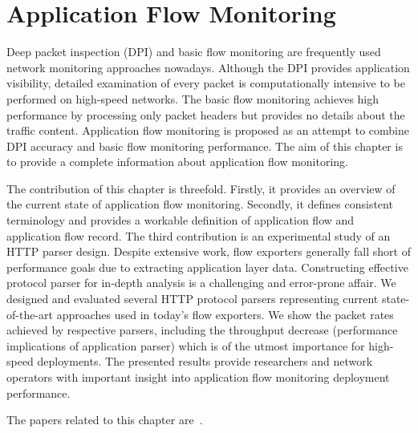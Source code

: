 \chapter{Application Flow Monitoring}

\begin{chapintro}

Deep packet inspection (DPI) and basic flow monitoring are frequently used network monitoring approaches nowadays. Although the DPI provides application visibility, detailed examination of every packet is computationally intensive to be performed on high-speed networks. The basic flow monitoring achieves high performance by processing only packet headers but provides no details about the traffic content. Application flow monitoring is proposed as an attempt to combine DPI accuracy and basic flow monitoring performance. The aim of this chapter is to provide a complete information about application flow monitoring. 

The contribution of this chapter is threefold. Firstly, it provides an overview of the current state of application flow monitoring. Secondly, it defines consistent terminology and provides a workable definition of application flow and application flow record. The third contribution is an experimental study of an HTTP parser design. Despite extensive work, flow exporters generally fall short of performance goals due to extracting application layer data. Constructing effective protocol parser for in-depth analysis is a challenging and error-prone affair. We designed and evaluated several HTTP protocol parsers representing current state-of-the-art approaches used in today's flow exporters. We show the packet rates achieved by respective parsers, including the throughput decrease (performance implications of application parser) which is of the utmost importance for high-speed deployments. The presented results provide researchers and network operators with important insight into application flow monitoring deployment performance.


The papers related to this chapter are~\cite{Velan-2014-Next, Velan-2013-Design}.


\end{chapintro}
